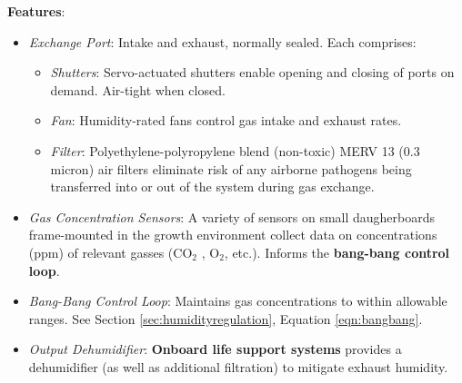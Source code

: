\textbf{Features}:
\begin{itemize}
    \item \textit{Exchange Port}: Intake and exhaust, normally sealed. Each comprises:
    \begin{itemize}
        \item \textit{Shutters}: Servo-actuated shutters enable opening and closing of ports on demand. Air-tight when closed.
        \item \textit{Fan}: Humidity-rated fans control gas intake and exhaust rates.
        \item \textit{Filter}: Polyethylene-polyropylene blend (non-toxic) MERV 13 (0.3 micron) air filters \cite{filter} eliminate risk of any airborne pathogens being transferred into or out of the system during gas exchange.
    \end{itemize}
    \item \textit{Gas Concentration Sensors}: A variety of sensors on small daugherboards frame-mounted in the growth environment collect data on concentrations (ppm) of relevant gasses (CO${}_2$ \cite{co2sensor}, O${}_2$, etc.). Informs the \textbf{bang-bang control loop}.
    \item \textit{Bang-Bang Control Loop}: Maintains gas concentrations to within allowable ranges. See Section \ref{sec:humidityregulation}, Equation \ref{eqn:bangbang}.
    \item \textit{Output Dehumidifier}: \textbf{Onboard life support systems} provides a dehumidifier (as well as additional filtration) to mitigate exhaust humidity.
\end{itemize}